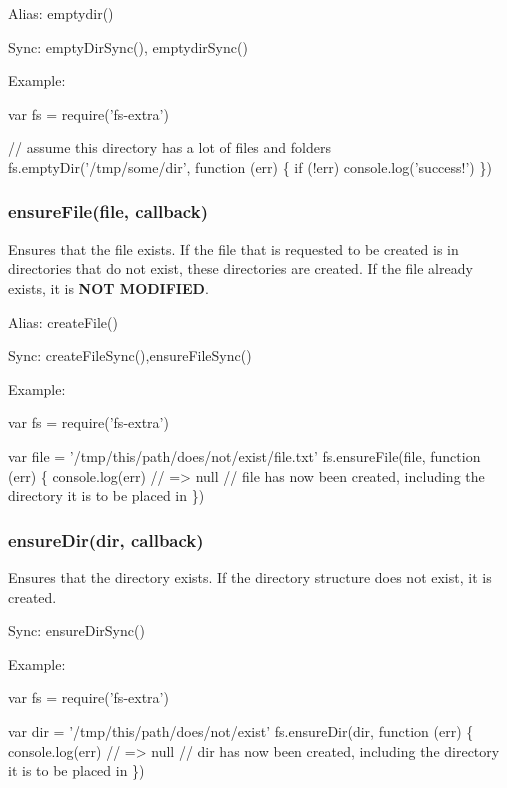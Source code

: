 Alias\+: {\ttfamily emptydir()}

Sync\+: {\ttfamily empty\+Dir\+Sync()}, {\ttfamily emptydir\+Sync()}

Example\+:


\begin{DoxyCode}
var fs = require('fs-extra')

// assume this directory has a lot of files and folders
fs.emptyDir('/tmp/some/dir', function (err) \{
  if (!err) console.log('success!')
\})
\end{DoxyCode}


\subsubsection*{ensure\+File(file, callback)}

Ensures that the file exists. If the file that is requested to be created is in directories that do not exist, these directories are created. If the file already exists, it is {\bfseries N\+OT M\+O\+D\+I\+F\+I\+ED}.

Alias\+: {\ttfamily create\+File()}

Sync\+: {\ttfamily create\+File\+Sync()},{\ttfamily ensure\+File\+Sync()}

Example\+:


\begin{DoxyCode}
var fs = require('fs-extra')

var file = '/tmp/this/path/does/not/exist/file.txt'
fs.ensureFile(file, function (err) \{
  console.log(err) // => null
  // file has now been created, including the directory it is to be placed in
\})
\end{DoxyCode}


\subsubsection*{ensure\+Dir(dir, callback)}

Ensures that the directory exists. If the directory structure does not exist, it is created.

Sync\+: {\ttfamily ensure\+Dir\+Sync()}

Example\+:


\begin{DoxyCode}
var fs = require('fs-extra')

var dir = '/tmp/this/path/does/not/exist'
fs.ensureDir(dir, function (err) \{
  console.log(err) // => null
  // dir has now been created, including the directory it is to be placed in
\})
\end{DoxyCode}


